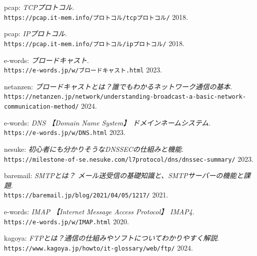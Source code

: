 \documentclass{ltjsarticle} %
\begin{document}
\begin{thebibliography}{99} %
    
  pcap: 
  \emph{TCPプロトコル}. \\
  \verb|https://pcap.it-mem.info/プロトコル/tcpプロトコル/|  2018. 

  pcap: 
  \emph{IPプロトコル}. \\
  \verb|https://pcap.it-mem.info/プロトコル/ipプロトコル/|  2018. 

  e-words: 
  \emph{ブロードキャスト}. \\
  \verb|https://e-words.jp/w/ブロードキャスト.html|  2023. 

  netanzen: 
  \emph{ブロードキャストとは？誰でもわかるネットワーク通信の基本}. \\
  \verb|https://netanzen.jp/network/understanding-broadcast-a-basic-network-communication-method/|  2024. 

  e-words: 
  \emph{DNS 【Domain Name System】 ドメインネームシステム}. \\
  \verb|https://e-words.jp/w/DNS.html|  2023. 

  nesuke: 
  \emph{初心者にも分かりそうなDNSSECの仕組みと機能}. \\
  \verb|https://milestone-of-se.nesuke.com/l7protocol/dns/dnssec-summary/|  2023. 

  baremail: 
  \emph{SMTPとは？ メール送受信の基礎知識と、SMTPサーバーの機能と課題}. \\
  \verb|https://baremail.jp/blog/2021/04/05/1217/|  2021. 

  e-words: 
  \emph{IMAP 【Internet Message Access Protocol】 IMAP4}. \\
  \verb|https://e-words.jp/w/IMAP.html|  2020. 

  kagoya: 
  \emph{FTPとは？通信の仕組みやソフトについてわかりやすく解説}. \\
  \verb|https://www.kagoya.jp/howto/it-glossary/web/ftp/|  2024. 

\end{thebibliography}
\end{document}
